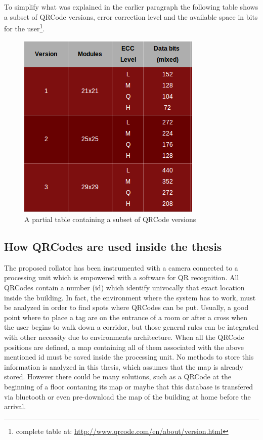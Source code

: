 \newpage
To simplify what was explained in the earlier paragraph the following table shows a subset of QRCode versions, error correction level and the available space in bits for the user\footnote{complete table at: \protect\url{http://www.qrcode.com/en/about/version.html}}.

\vspace{2.5cm}
\begin{figure}[hbt]
    \centering
    \includegraphics[scale=0.95]{img/qrversion.png}
    \caption{A partial table containing a subset of QRCode versions \label{qrversion}}
\end{figure}

\newpage

\subsection{How QRCodes are used inside the thesis}
The proposed rollator has been instrumented with a camera connected to a processing unit which is empowered with a software for QR recognition.
All QRCodes contain a number (id) which identify univocally that exact location inside the building. In fact, the environment where the system has to work, must be analyzed in order to find spots where QRCodes can be put.
Usually, a good point where to place a tag are on the entrance of a room or after a cross when the user begins to walk down a corridor, but those general rules can be integrated with other necessity due to environments architecture. 
When all the QRCode positions are defined, a map containing all of them associated with the above mentioned id must be saved inside the processing unit. No methods to store this information is analyzed in this thesis, which assumes that the map is already stored. However there could be many solutions, such as a QRCode at the beginning of a floor contaning its map or maybe that this database is transfered via bluetooth or even pre-download the map of the building at home before the arrival.





   













  
